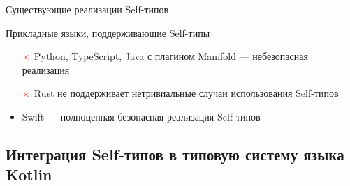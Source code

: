 \documentclass[usenames, dvipsnames]{beamer}
\begin{document}
\begin{frame}{Существующие реализации Self-типов}
        \begin{block}{Прикладные языки, поддерживающие Self-типы}
            \begin{itemize}
                \item[$\color{red} \mathbf{\times}$] Python, TypeScript, Java с плагином Manifold --- небезопасная реализация
                \item[$\color{red} \mathbf{\times}$] Rust не поддерживает нетривиальные случаи использования Self-типов %
                \item Swift --- полноценная безопасная реализация Self-типов
            \end{itemize}
        \end{block}
    \end{frame}


    \subsection{Интеграция Self-типов в типовую систему языка Kotlin}
\end{document}
